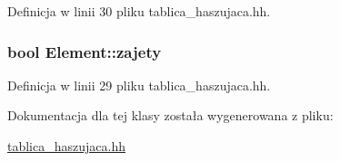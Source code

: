 \-Definicja w linii 30 pliku tablica\-\_\-haszujaca.\-hh.

\hypertarget{class_element_ae689c2af2c94f3b9fb1c07e89358b3a0}{
\subsubsection[{zajety}]{\setlength{\rightskip}{0pt plus 5cm}bool {\bf \-Element\-::zajety}}}\label{class_element_ae689c2af2c94f3b9fb1c07e89358b3a0}


\-Definicja w linii 29 pliku tablica\-\_\-haszujaca.\-hh.



\-Dokumentacja dla tej klasy została wygenerowana z pliku\-:\begin{DoxyCompactItemize}
\item 
\hyperlink{tablica__haszujaca_8hh}{tablica\-\_\-haszujaca.\-hh}\end{DoxyCompactItemize}
